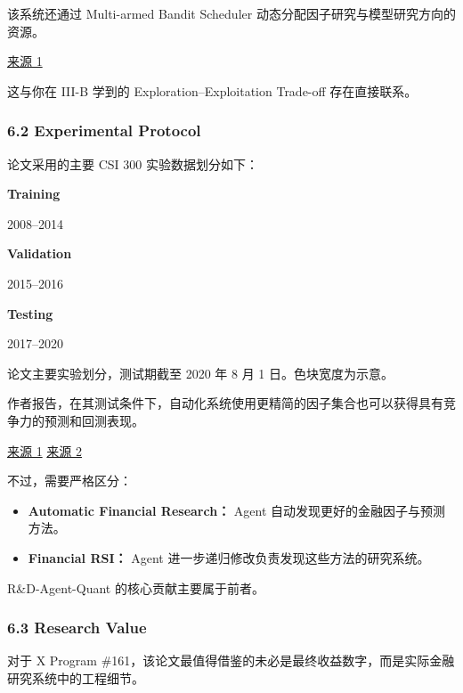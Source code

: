 
该系统还通过 Multi-armed Bandit Scheduler 动态分配因子研究与模型研究方向的资源。

\href{https://arxiv.org/html/2505.15155v2}{来源 1}

这与你在 III-B 学到的 Exploration--Exploitation Trade-off 存在直接联系。

\hypertarget{part-3-44-0001-experimental-protocol}{%
\subsubsection{6.2 Experimental Protocol}\label{part-3-44-0001-experimental-protocol}}

论文采用的主要 CSI 300 实验数据划分如下：

\textbf{Training}

2008--2014

\textbf{Validation}

2015--2016

\textbf{Testing}

2017--2020

论文主要实验划分，测试期截至 2020 年 8 月 1 日。色块宽度为示意。

作者报告，在其测试条件下，自动化系统使用更精简的因子集合也可以获得具有竞争力的预测和回测表现。

\href{https://arxiv.org/html/2505.15155v2}{来源 1} \href{https://arxiv.org/html/2505.15155v2}{来源 2}

不过，需要严格区分：

\begin{itemize}
\tightlist
\item
  \textbf{Automatic Financial Research：} Agent 自动发现更好的金融因子与预测方法。
\item
  \textbf{Financial RSI：} Agent 进一步递归修改负责发现这些方法的研究系统。
\end{itemize}

R\&D-Agent-Quant 的核心贡献主要属于前者。

\hypertarget{part-3-44-0001-research-value}{%
\subsubsection{6.3 Research Value}\label{part-3-44-0001-research-value}}

对于 X Program \#161，该论文最值得借鉴的未必是最终收益数字，而是实际金融研究系统中的工程细节。

